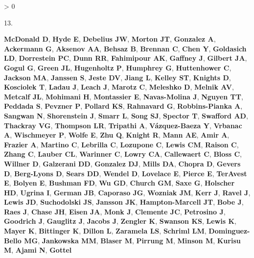 \documentclass[
]{article}
\newlength{\cslhangindent}
\newlength{\csllabelwidth}
\newenvironment{CSLReferences}[3] %
 {%
  \setlength{\parindent}{0pt}
  \ifodd #1 \everypar{\setlength{\hangindent}{\cslhangindent}}\ignorespaces\fi
  \ifnum #2 > 0
  \setlength{\parskip}{#2\baselineskip}
  \fi
 }%
 {}
\newcommand{\CSLLeftMargin}[1]{\parbox[t]{\csllabelwidth}{#1}}
\newcommand{\CSLRightInline}[1]{\parbox[t]{\linewidth - \csllabelwidth}{#1}}
\begin{document}
\begin{CSLReferences}{0}{0}
\leavevmode\hypertarget{ref-McDonald2018}{}%
\CSLLeftMargin{13. }
\CSLRightInline{\textbf{McDonald D}, \textbf{Hyde E}, \textbf{Debelius
JW}, \textbf{Morton JT}, \textbf{Gonzalez A}, \textbf{Ackermann G},
\textbf{Aksenov AA}, \textbf{Behsaz B}, \textbf{Brennan C}, \textbf{Chen
Y}, \textbf{Goldasich LD}, \textbf{Dorrestein PC}, \textbf{Dunn RR},
\textbf{Fahimipour AK}, \textbf{Gaffney J}, \textbf{Gilbert JA},
\textbf{Gogul G}, \textbf{Green JL}, \textbf{Hugenholtz P},
\textbf{Humphrey G}, \textbf{Huttenhower C}, \textbf{Jackson MA},
\textbf{Janssen S}, \textbf{Jeste DV}, \textbf{Jiang L}, \textbf{Kelley
ST}, \textbf{Knights D}, \textbf{Kosciolek T}, \textbf{Ladau J},
\textbf{Leach J}, \textbf{Marotz C}, \textbf{Meleshko D}, \textbf{Melnik
AV}, \textbf{Metcalf JL}, \textbf{Mohimani H}, \textbf{Montassier E},
\textbf{Navas-Molina J}, \textbf{Nguyen TT}, \textbf{Peddada S},
\textbf{Pevzner P}, \textbf{Pollard KS}, \textbf{Rahnavard G},
\textbf{Robbins-Pianka A}, \textbf{Sangwan N}, \textbf{Shorenstein J},
\textbf{Smarr L}, \textbf{Song SJ}, \textbf{Spector T}, \textbf{Swafford
AD}, \textbf{Thackray VG}, \textbf{Thompson LR}, \textbf{Tripathi A},
\textbf{Vázquez-Baeza Y}, \textbf{Vrbanac A}, \textbf{Wischmeyer P},
\textbf{Wolfe E}, \textbf{Zhu Q}, \textbf{Knight R}, \textbf{Mann AE},
\textbf{Amir A}, \textbf{Frazier A}, \textbf{Martino C},
\textbf{Lebrilla C}, \textbf{Lozupone C}, \textbf{Lewis CM},
\textbf{Raison C}, \textbf{Zhang C}, \textbf{Lauber CL},
\textbf{Warinner C}, \textbf{Lowry CA}, \textbf{Callewaert C},
\textbf{Bloss C}, \textbf{Willner D}, \textbf{Galzerani DD},
\textbf{Gonzalez DJ}, \textbf{Mills DA}, \textbf{Chopra D},
\textbf{Gevers D}, \textbf{Berg-Lyons D}, \textbf{Sears DD},
\textbf{Wendel D}, \textbf{Lovelace E}, \textbf{Pierce E},
\textbf{TerAvest E}, \textbf{Bolyen E}, \textbf{Bushman FD}, \textbf{Wu
GD}, \textbf{Church GM}, \textbf{Saxe G}, \textbf{Holscher HD},
\textbf{Ugrina I}, \textbf{German JB}, \textbf{Caporaso JG},
\textbf{Wozniak JM}, \textbf{Kerr J}, \textbf{Ravel J}, \textbf{Lewis
JD}, \textbf{Suchodolski JS}, \textbf{Jansson JK},
\textbf{Hampton-Marcell JT}, \textbf{Bobe J}, \textbf{Raes J},
\textbf{Chase JH}, \textbf{Eisen JA}, \textbf{Monk J}, \textbf{Clemente
JC}, \textbf{Petrosino J}, \textbf{Goodrich J}, \textbf{Gauglitz J},
\textbf{Jacobs J}, \textbf{Zengler K}, \textbf{Swanson KS},
\textbf{Lewis K}, \textbf{Mayer K}, \textbf{Bittinger K}, \textbf{Dillon
L}, \textbf{Zaramela LS}, \textbf{Schriml LM}, \textbf{Dominguez-Bello
MG}, \textbf{Jankowska MM}, \textbf{Blaser M}, \textbf{Pirrung M},
\textbf{Minson M}, \textbf{Kurisu M}, \textbf{Ajami N}, \textbf{Gottel
}}
\end{CSLReferences}
\end{document}
